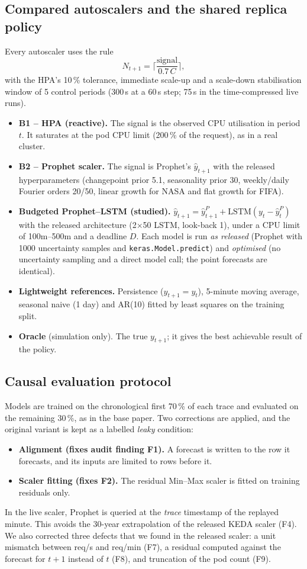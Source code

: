 \documentclass[conference,a4paper]{IEEEtran}
\begin{document}
\subsection{Compared autoscalers and the shared replica policy}
Every autoscaler uses the rule
\[
  N_{t+1}=\Big\lceil \frac{\text{signal}}{0.7\,C} \Big\rceil,
\]
with the HPA's 10\,\% tolerance, immediate scale-up and a scale-down stabilisation window of 5 control periods
(300\,s at a 60\,s step; 75\,s in the time-compressed live runs).
\begin{itemize}
\item \textbf{B1 -- HPA (reactive).} The signal is the observed CPU utilisation in period $t$. It saturates at the
      pod CPU limit (200\,\% of the request), as in a real cluster.
\item \textbf{B2 -- Prophet scaler.} The signal is Prophet's $\hat y_{t+1}$ with the released hyperparameters
      (changepoint prior 5.1, seasonality prior 30, weekly/daily Fourier orders 20/50, linear growth for NASA and
      flat growth for FIFA).
\item \textbf{Budgeted Prophet--LSTM (studied).} $\hat y_{t+1}=\hat y^{P}_{t+1}+\mathrm{LSTM}(y_t-\hat y^{P}_t)$
      with the released architecture (2$\times$50 LSTM, look-back 1), under a CPU limit of 100m--500m and a
      deadline $D$. Each model is run \emph{as released} (Prophet with 1000 uncertainty samples and
      \texttt{keras.Model.predict}) and \emph{optimised} (no uncertainty sampling and a direct model call; the
      point forecasts are identical).
\item \textbf{Lightweight references.} Persistence ($\hat y_{t+1}=y_t$), 5-minute moving average, seasonal naive
      (1 day) and AR(10) fitted by least squares on the training split.
\item \textbf{Oracle} (simulation only). The true $y_{t+1}$; it gives the best achievable result of the policy.
\end{itemize}

\subsection{Causal evaluation protocol}
Models are trained on the chronological first 70\,\% of each trace and evaluated on the remaining 30\,\%, as in
the base paper. Two corrections are applied, and the original variant is kept as a labelled \emph{leaky}
condition:
\begin{itemize}
\item \textbf{Alignment (fixes audit finding F1).} A forecast is written to the row it forecasts, and its
      inputs are limited to rows before it.
\item \textbf{Scaler fitting (fixes F2).} The residual Min--Max scaler is fitted on training residuals only.
\end{itemize}
In the live scaler, Prophet is queried at the \emph{trace} timestamp of the replayed minute. This avoids the
30-year extrapolation of the released KEDA scaler (F4). We also corrected three defects that we found in the
released scaler: a unit mismatch between req/s and req/min (F7), a residual computed against the forecast for
$t{+}1$ instead of $t$ (F8), and truncation of the pod count (F9).
\end{document}
